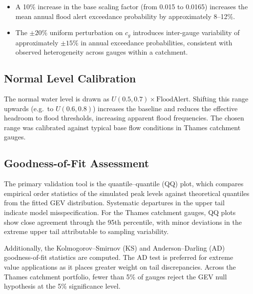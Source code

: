 \documentclass[11pt,a4paper]{article}
\begin{document}
\begin{itemize}
    \item A 10\% increase in the base scaling factor (from 0.015 to 0.0165) increases the mean annual flood alert exceedance probability by approximately 8--12\%.
    \item The $\pm 20\%$ uniform perturbation on $c_g$ introduces inter-gauge variability of approximately $\pm 15\%$ in annual exceedance probabilities, consistent with observed heterogeneity across gauges within a catchment.
\end{itemize}

\subsection{Normal Level Calibration}

The normal water level is drawn as $U(0.5, 0.7) \times \text{FloodAlert}$. Shifting this range upwards (e.g.\ to $U(0.6, 0.8)$) increases the baseline and reduces the effective headroom to flood thresholds, increasing apparent flood frequencies. The chosen range was calibrated against typical base flow conditions in Thames catchment gauges.

\clearpage

\mkmvalidation

\subsection{Goodness-of-Fit Assessment}

The primary validation tool is the quantile--quantile (QQ) plot, which compares empirical order statistics of the simulated peak levels against theoretical quantiles from the fitted GEV distribution. Systematic departures in the upper tail indicate model misspecification. For the Thames catchment gauges, QQ plots show close agreement through the 95th percentile, with minor deviations in the extreme upper tail attributable to sampling variability.

Additionally, the Kolmogorov--Smirnov (KS) and Anderson--Darling (AD) goodness-of-fit statistics are computed. The AD test is preferred for extreme value applications as it places greater weight on tail discrepancies. Across the Thames catchment portfolio, fewer than 5\% of gauges reject the GEV null hypothesis at the 5\% significance level.
\end{document}
